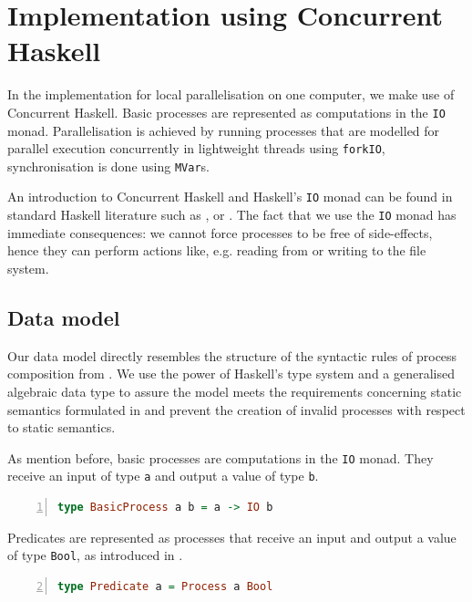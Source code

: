 \section{Implementation using Concurrent Haskell}
\label{chp:local}
In the implementation for local parallelisation on one computer, we make use of \textsf{Concurrent Haskell}. Basic processes are represented as computations in the \texttt{IO} monad. Parallelisation is achieved by running processes that are modelled for parallel execution concurrently in lightweight threads using \texttt{forkIO}, synchronisation is done using \texttt{MVar}s.

An introduction to \textsf{Concurrent Haskell} and \textsf{Haskell}'s \texttt{IO} monad can be found in standard \textsf{Haskell} literature such as \cite{Hutton}, \cite{Bird} or \cite{Marlow}. The fact that we use the \texttt{IO} monad has immediate consequences: we cannot force processes to be free of side-effects, hence they can perform actions like, e.g. reading from or writing to the file system.

\subsection{Data model}
\label{chp:local_model}
Our data model directly resembles the structure of the syntactic rules of process composition from . We use the power of \textsf{Haskell}'s type system and a generalised algebraic data type to assure the model meets the requirements concerning static semantics formulated in  and prevent the creation of invalid processes with respect to static semantics.

As mention before, basic processes are computations in the \texttt{IO} monad. They receive an input of type \texttt{a} and output a value of type \texttt{b}.
\begin{lstlisting}[language=Haskell,caption=Representation of basic processes as computations in the \texttt{IO} monad.,label=fig:local_computation,numbers=left,frame=bt]
type BasicProcess a b = a -> IO b
\end{lstlisting}

Predicates are represented as processes that receive an input and output a value of type \texttt{Bool}, as introduced in .
\begin{lstlisting}[language=Haskell,caption=Representation of predicates as processes.,label=fig:local_computation,numbers=left,frame=bt,firstnumber=2]
type Predicate a = Process a Bool
\end{lstlisting}

